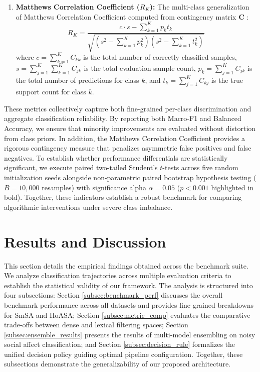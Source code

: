 \documentclass{ieeeaccess}
\begin{document}
\begin{enumerate}
    \item \textbf{Matthews Correlation Coefficient ($R_K$):} The multi-class generalization of Matthews Correlation Coefficient computed from contingency matrix $\mathbf{C}$ \cite{zhang2023deep}:
    \begin{equation}
        R_K = \frac{c \cdot s - \sum_{k=1}^K p_k t_k}{\sqrt{\left(s^2 - \sum_{k=1}^K p_k^2\right)\left(s^2 - \sum_{k=1}^K t_k^2\right)}}
    \end{equation}
    where $c = \sum_{k=1}^K C_{kk}$ is the total number of correctly classified samples, $s = \sum_{j=1}^K \sum_{k=1}^K C_{jk}$ is the total evaluation sample count, $p_k = \sum_{j=1}^K C_{jk}$ is the total number of predictions for class $k$, and $t_k = \sum_{j=1}^K C_{kj}$ is the true support count for class $k$.
\end{enumerate}
These metrics collectively capture both fine-grained per-class discrimination and aggregate classification reliability. By reporting both Macro-F1 and Balanced Accuracy, we ensure that minority improvements are evaluated without distortion from class priors. In addition, the Matthews Correlation Coefficient provides a rigorous contingency measure that penalizes asymmetric false positives and false negatives. To establish whether performance differentials are statistically significant, we execute paired two-tailed Student's $t$-tests across five random initialization seeds alongside non-parametric paired bootstrap hypothesis testing ($B = 10{,}000$ resamples) with significance alpha $\alpha = 0.05$ ($p < 0.001$ highlighted in bold). Together, these indicators establish a robust benchmark for comparing algorithmic interventions under severe class imbalance.

\section{Results and Discussion}
\label{sec:results}

This section details the empirical findings obtained across the benchmark suite. We analyze classification trajectories across multiple evaluation criteria to establish the statistical validity of our framework. The analysis is structured into four subsections: Section \ref{subsec:benchmark_perf} discusses the overall benchmark performance across all datasets and provides fine-grained breakdowns for SmSA and HoASA; Section \ref{subsec:metric_comp} evaluates the comparative trade-offs between dense and lexical filtering spaces; Section \ref{subsec:ensemble_results} presents the results of multi-model ensembling on noisy social affect classification; and Section \ref{subsec:decision_rule} formalizes the unified decision policy guiding optimal pipeline configuration. Together, these subsections demonstrate the generalizability of our proposed architecture.
\end{document}
